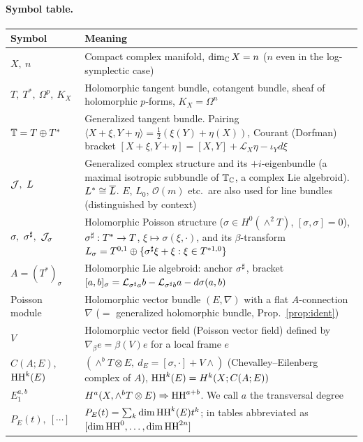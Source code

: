 \paragraph{Symbol table.}
\begin{longtable}{>{\raggedright\arraybackslash}p{3.5cm}>{\raggedright\arraybackslash}p{11.3cm}}
\toprule Symbol & Meaning\\ \midrule\endhead
\bottomrule\endfoot
\footnotesize $X,\ n$ & Compact complex manifold, $\dim_\mathbb C X=n$ ($n$ even in the log-symplectic case)\\
\footnotesize $T,\ T^*,\ \Omega^p,\ K_X$ & Holomorphic tangent bundle, cotangent bundle, sheaf of holomorphic $p$-forms, $K_X=\Omega^n$\\
\footnotesize $\mathbb T=T\oplus T^*$ & Generalized tangent bundle. Pairing $\langle X+\xi,Y+\eta\rangle=\tfrac12(\xi(Y)+\eta(X))$, Courant (Dorfman) bracket $[X+\xi,Y+\eta]=[X,Y]+\mathcal L_X\eta-\iota_Yd\xi$\\
\footnotesize $\Jc,\ L$ & Generalized complex structure and its $+i$-eigenbundle (a maximal isotropic subbundle of $\mathbb T_\mathbb C$, a complex Lie algebroid). $L^*\cong\overline L$. $E$, $L_0$, $\mathcal O(m)$ etc.\ are also used for line bundles (distinguished by context)\\
\footnotesize $\sigma,\ \sigma^\sh,\ \Jc_\sigma$ & Holomorphic Poisson structure ($\sigma\in H^0(\wedge^2T)$, $[\sigma,\sigma]=0$), $\sigma^\sharp:T^*\to T$, $\xi\mapsto\sigma(\xi,\cdot)$, and its $\beta$-transform $L_\sigma=T^{0,1}\oplus\{\sigma^\sharp\xi+\xi:\xi\in T^{*1,0}\}$\\
\footnotesize $A=(T^*)_\sigma$ & Holomorphic Lie algebroid: anchor $\sigma^\sharp$, bracket $[a,b]_\sigma=\mathcal L_{\sigma^\sharp a}b-\mathcal L_{\sigma^\sharp b}a-d\sigma(a,b)$\\
\footnotesize Poisson module & Holomorphic vector bundle $(E,\nabla)$ with a flat $A$-connection $\nabla$ ($=$ generalized holomorphic bundle, Prop.\ \ref{prop:ident})\\
\footnotesize $V$ & Holomorphic vector field (Poisson vector field) defined by $\nabla_\beta e=\beta(V)e$ for a local frame $e$\\
\footnotesize $C(A;E)$, $\mathrm{HH}^k(E)$ & $(\wedge^bT\otimes E,\ d_E=[\sigma,\cdot]+V\wedge)$ (Chevalley--Eilenberg complex of $A$), $\mathrm{HH}^k(E)=H^k(X;C(A;E))$\\
\footnotesize $E_1^{a,b}$ & $H^a(X,\wedge^bT\otimes E)\Rightarrow\mathrm{HH}^{a+b}$. We call $a$ the transversal degree\\
\footnotesize $P_E(t),\ [\cdots]$ & $P_E(t)=\sum_k\dim\mathrm{HH}^k(E)t^k$; in tables abbreviated as $[\dim\mathrm{HH}^0,\dots,\dim\mathrm{HH}^{2n}]$\\

\end{longtable}
